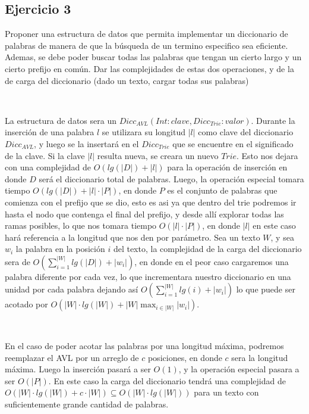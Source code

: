 \documentclass[10pt, a4paper]{article}
\begin{document}
\subsection*{Ejercicio 3}

Proponer una estructura de datos que permita implementar un diccionario de palabras de manera de que la b\'usqueda de un termino especifico sea eficiente. Ademas, se debe poder buscar todas las palabras que tengan un cierto largo y un cierto prefijo en com\'un. Dar las complejidades de estas dos operaciones, y de la de carga del diccionario (dado un texto, cargar todas sus palabras)

~

La estructura de datos sera un $Dicc_{AVL}(Int: clave, Dicc_{Trie}: valor)$. Durante la inserci\'on de una palabra $l$ se utilizara su longitud $|l|$ como clave del diccionario $Dicc_{AVL}$, y luego se la insertar\'a en el $Dicc_{Trie}$ que se encuentre en el significado de la clave. Si la clave $|l|$ resulta nueva, se creara un nuevo $Trie$. Esto nos dejara con una complejidad de $O(lg(|D|)+|l|)$ para la operaci\'on de inserci\'on en donde $D$ ser\'a el diccionario total de palabras. Luego, la operaci\'on especial tomara tiempo $O(lg(|D|)+|l| \cdot |P|)$, en donde $P$ es el conjunto de palabras que comienza con el prefijo que se dio, esto es asi ya que dentro del trie podremos ir hasta el nodo que contenga el final del prefijo, y desde all\'i explorar todas las ramas posibles, lo que nos tomara tiempo $O(|l| \cdot |P|)$, en donde $|l|$ en este caso har\'a referencia a la longitud que nos den por par\'ametro. Sea un texto $W$, y sea $w_i$ la palabra en la posici\'on $i$ del texto, la complejidad de la carga del 
diccionario 
sera de $O(\sum_{i=1}^{|W|}lg(|D|)+|w_i|)$, en donde en el peor caso cargaremos una palabra diferente por cada vez, lo que incrementara nuestro diccionario en una unidad por cada palabra dejando as\'i $O(\sum_{i=1}^{|W|}lg(i)+|w_i|)$ lo que puede ser acotado por $O(|W|\cdot lg(|W|)+ |W| \max_{i \in |W|}|w_i|)$.

~

En el caso de poder acotar las palabras por una longitud m\'axima, podremos reemplazar el AVL por un arreglo de $c$ posiciones, en donde $c$ sera la longitud m\'axima. Luego la inserci\'on pasar\'a a ser $O(1)$, y la operaci\'on especial pasara a ser $O(|P|)$. En este caso la carga del diccionario tendr\'a una complejidad de $O(|W|\cdot lg(|W|)+ c \cdot |W|) \subseteq O(|W| \cdot lg(|W|))$ para un texto con suficientemente grande cantidad de palabras.
\end{document}
